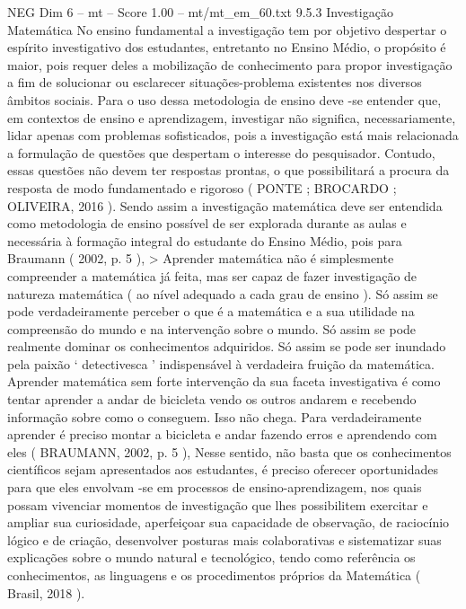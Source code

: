 \begin{textsample}{NEG Dim 6 – mt – Score 1.00 – mt/mt\_em\_60.txt}  \label{ex:f6_neg_128}
9.5.3 Investigação Matemática No ensino fundamental a investigação tem por objetivo despertar o espírito investigativo dos estudantes, entretanto no Ensino Médio, o propósito é maior, pois requer deles a mobilização de conhecimento para propor investigação a fim de solucionar ou esclarecer situações-problema existentes nos diversos âmbitos sociais.
Para o uso dessa metodologia de ensino deve -se entender que, em contextos de ensino e aprendizagem, investigar não significa, necessariamente, lidar apenas com problemas sofisticados, pois a investigação está mais relacionada a formulação de questões que despertam o interesse do pesquisador.
Contudo, essas questões não devem ter respostas prontas, o que possibilitará a procura da resposta de modo fundamentado e rigoroso ( PONTE ; BROCARDO ; OLIVEIRA, 2016 ).
Sendo assim a investigação matemática deve ser entendida como metodologia de ensino possível de ser explorada durante as aulas e necessária à formação integral do estudante do Ensino Médio, pois para Braumann ( 2002, p. 5 ), > Aprender matemática não é simplesmente compreender a matemática já feita, mas ser capaz de fazer investigação de natureza matemática ( ao nível adequado a cada grau de ensino ).
Só assim se pode verdadeiramente perceber o que é a matemática e a sua utilidade na compreensão do mundo e na intervenção sobre o mundo.
Só assim se pode realmente dominar os conhecimentos adquiridos.
Só assim se pode ser inundado pela paixão ‘ detectivesca ’ indispensável à verdadeira fruição da matemática.
Aprender matemática sem forte intervenção da sua faceta investigativa é como tentar aprender a andar de bicicleta vendo os outros andarem e recebendo informação sobre como o conseguem.
Isso não chega.
Para verdadeiramente aprender é preciso montar a bicicleta e andar fazendo erros e aprendendo com eles ( BRAUMANN, 2002, p. 5 ), Nesse sentido, não basta que os conhecimentos científicos sejam apresentados aos estudantes, é preciso oferecer oportunidades para que eles envolvam -se em processos de ensino-aprendizagem, nos quais possam vivenciar momentos de investigação que lhes possibilitem exercitar e ampliar sua curiosidade, aperfeiçoar sua capacidade de observação, de raciocínio lógico e de criação, desenvolver posturas mais colaborativas e sistematizar suas explicações sobre o mundo natural e tecnológico, tendo como referência os conhecimentos, as linguagens e os procedimentos próprios da Matemática ( Brasil, 2018 ).

\end{textsample}
